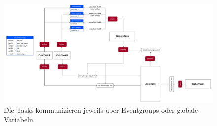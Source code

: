 \documentclass[ngerman,10pt,a4paper,titlepage]{report}
\begin{document}
	\begin{figure}
		\centering
		\includegraphics[width=1.1\linewidth]{diagrams/TaskOverview}
		\caption[Taskübersicht]{Die Tasks kommunizieren jeweils über Eventgroups oder globale Variabeln.}
		\label{fig:taskoverview}
	\end{figure}
\end{document}
